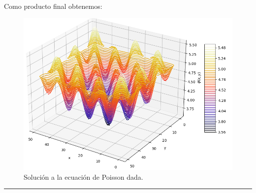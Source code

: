 \documentclass[11pt]{article}
\begin{document}
	Como producto final obtenemos:
\newpage
	\begin{figure}[h!]
		\centering
		\includegraphics[width=13cm]{Img/1.7.PNG}
		\caption{Solución a la ecuación de Poisson dada.}
	\end{figure}

\hrule
	
\end{document}
